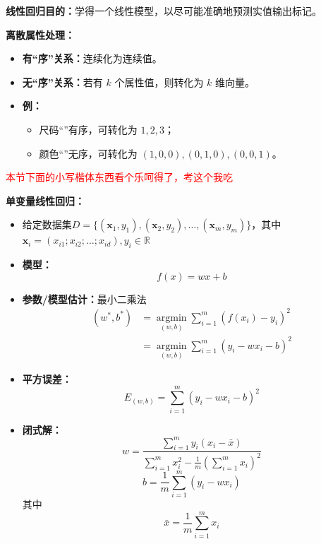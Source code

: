 \documentclass[../main.tex]{subfiles}
\begin{document}
\begin{enumerate}
    \item \textbf{线性回归目的：}学得一个线性模型，以尽可能准确地预测实值输出标记。

    \item \textbf{离散属性处理：}
    \begin{itemize}
        \item \textbf{有“序”关系：}连续化为连续值。
        \item \textbf{无“序”关系：}若有 $k$ 个属性值，则转化为 $k$ 维向量。
        \item \textbf{例：}
        \begin{itemize}
            \item 尺码“”有序，可转化为 $1,2,3$；
            \item 颜色“”无序，可转化为 $(1,0,0),(0,1,0),(0,0,1)$。
        \end{itemize}
    \end{itemize}
    \textcolor{red}{本节下面的小写楷体东西看个乐呵得了，考这个我吃}
    {\small\kaishu
    \item \textbf{单变量线性回归：}
    \begin{itemize}
        \item 给定数据集$D = \{(\mathbf{x}_1, y_1), (\mathbf{x}_2, y_2), \dots, (\mathbf{x}_m, y_m)\}$，其中$\mathbf{x}_i = (x_{i1}; x_{i2}; \dots; x_{id}), y_i \in \mathbb{R}$
        \item \textbf{模型：}
        $$
        f(x)=wx+b
        $$
        
        \item \textbf{参数/模型估计：}最小二乘法
        $$
        \begin{aligned}
        (w^{*},b^{*})
        &=\underset{(w,b)}{\operatorname*{argmin}}\sum_{i=1}^{m}(f(x_{i})-y_{i})^{2} \\
        &=\underset{(w,b)}{\operatorname*{argmin}}\sum_{i=1}^{m}(y_{i}-wx_{i}-b)^{2}
        \end{aligned}
        $$
        
        \item \textbf{平方误差：}
        $$
        E_{(w,b)}=\sum_{i=1}^{m}(y_i-wx_i-b)^2
        $$
        
        \item \textbf{闭式解：}
        $$
        w=\frac{\sum_{i=1}^{m} y_i(x_i-\bar{x})}{\sum_{i=1}^{m} x_i^2-\frac{1}{m}\left(\sum_{i=1}^{m}x_i\right)^2}
        $$
        $$
        b=\frac{1}{m}\sum_{i=1}^{m}(y_i-wx_i)
        $$
        其中
        $$
        \bar{x}=\frac{1}{m}\sum_{i=1}^{m}x_i
        $$
    \end{itemize}

}
\end{enumerate}
\end{document}
